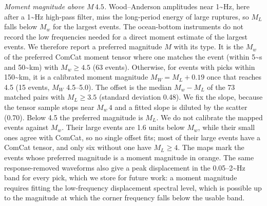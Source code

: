 \documentclass[review]{seismica}
\begin{document}
\emph{Moment magnitude above \(M\,4.5\).} Wood--Anderson amplitudes near
1\textasciitilde Hz, here after a 1\textasciitilde Hz high-pass filter,
miss the long-period energy of large ruptures, so \(M_L\) falls below
\(M_w\) for the largest events. The ocean-bottom instruments do not
record the low frequencies needed for a direct moment estimate of the
largest events. We therefore report a preferred magnitude \(M\) with its
type. It is the \(M_w\) of the preferred ComCat moment tensor
\citep{ComCat17} where one matches the event (within 5\textasciitilde s
and 50\textasciitilde km) with \(M_w\ge4.5\) (63 events). Otherwise, for
events with picks within 150\textasciitilde km, it is a calibrated
moment magnitude \(M_W = M_L + 0.19\) once that reaches 4.5 (15 events,
\(M_W\) 4.5--5.0). The offset is the median \(M_w-M_L\) of the 73
matched pairs with \(M_L\ge3.5\) (standard deviation 0.48). We fix the
slope, because the tensor sample stops near \(M_w\,4\) and a fitted
slope is diluted by the scatter (0.70). Below 4.5 the preferred
magnitude is \(M_L\). We do not calibrate the mapped events against
\(M_w\). Their large events are 1.6 units below \(M_w\), while their
small ones agree with ComCat, so no single offset fits; most of their
large events have a ComCat tensor, and only six without one have
\(M_L\ge4\). The maps mark the events whose preferred magnitude is a
moment magnitude in orange. The same response-removed waveforms also
give a peak displacement in the 0.05--2\textasciitilde Hz band for every
pick, which we store for future work: a moment magnitude requires
fitting the low-frequency displacement spectral level, which is possible
up to the magnitude at which the corner frequency falls below the usable
band.
\end{document}
